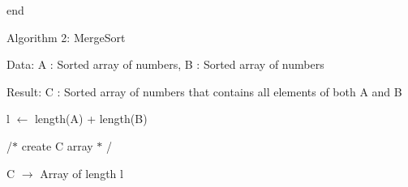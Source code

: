 \documentclass[12pt]{article}
\begin{document}
\begin{adjustwidth}{0.31in}{6.61in}
\begin{justify}
{\fontsize{11pt}{13.2pt}\selectfont end\par}
\end{justify}\par

\end{adjustwidth}

\begin{adjustwidth}{2.66in}{2.78in}
\begin{Center}
{\fontsize{11pt}{13.2pt}\selectfont Algorithm 2: MergeSort\par}
\end{Center}\par

\end{adjustwidth}

\begin{adjustwidth}{0.31in}{0.0in}
{\fontsize{11pt}{13.2pt}\selectfont Data:  A : Sorted  array  of numbers,  B : Sorted  array  of numbers\par}\par

\end{adjustwidth}

\begin{adjustwidth}{0.31in}{0.0in}
{\fontsize{11pt}{13.2pt}\selectfont Result:  C : Sorted  array  of numbers  that contains  all elements  of both  A and B\par}\par

\end{adjustwidth}

\begin{adjustwidth}{0.31in}{0.0in}
{\fontsize{11pt}{13.2pt}\selectfont l $ \leftarrow $  length(A) + length(B)\par}\par

\end{adjustwidth}

\begin{adjustwidth}{0.31in}{0.0in}
{\fontsize{11pt}{13.2pt}\selectfont /$\ast$  create  C array  $\ast$ /\par}\par

\end{adjustwidth}

\begin{adjustwidth}{0.31in}{0.0in}
{\fontsize{11pt}{13.2pt}\selectfont C $ \rightarrow $  Array  of length  l\par}\par

\end{adjustwidth}
\end{document}
